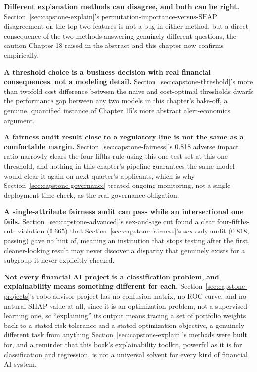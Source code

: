 \documentclass[../ai_in_finance]{subfiles}
\begin{document}
\textbf{Different explanation methods can disagree, and both can be right.} Section~\ref{sec:capstone-explain}'s permutation-importance-versus-SHAP disagreement on the top two features is not a bug in either method, but a direct consequence of the two methods answering genuinely different questions, the caution Chapter 18 raised in the abstract and this chapter now confirms empirically.

\textbf{A threshold choice is a business decision with real financial consequences, not a modeling detail.} Section~\ref{sec:capstone-threshold}'s more than twofold cost difference between the naive and cost-optimal thresholds dwarfs the performance gap between any two models in this chapter's bake-off, a genuine, quantified instance of Chapter 15's more abstract alert-economics argument.

\textbf{A fairness audit result close to a regulatory line is not the same as a comfortable margin.} Section~\ref{sec:capstone-fairness}'s 0.818 adverse impact ratio narrowly clears the four-fifths rule using this one test set at this one threshold, and nothing in this chapter's pipeline guarantees the same model would clear it again on next quarter's applicants, which is why Section~\ref{sec:capstone-governance} treated ongoing monitoring, not a single deployment-time check, as the real governance obligation.

\textbf{A single-attribute fairness audit can pass while an intersectional one fails.} Section~\ref{sec:capstone-advanced}'s sex-and-age cut found a clear four-fifths-rule violation ($0.665$) that Section~\ref{sec:capstone-fairness}'s sex-only audit ($0.818$, passing) gave no hint of, meaning an institution that stops testing after the first, cleaner-looking result may never discover a disparity that genuinely exists for a subgroup it never explicitly checked.

\textbf{Not every financial AI project is a classification problem, and explainability means something different for each.} Section~\ref{sec:capstone-projects}'s robo-advisor project has no confusion matrix, no ROC curve, and no natural SHAP value at all, since it is an optimization problem, not a supervised-learning one, so ``explaining'' its output means tracing a set of portfolio weights back to a stated risk tolerance and a stated optimization objective, a genuinely different task from anything Section~\ref{sec:capstone-explain}'s methods were built for, and a reminder that this book's explainability toolkit, powerful as it is for classification and regression, is not a universal solvent for every kind of financial AI system.
\end{document}
